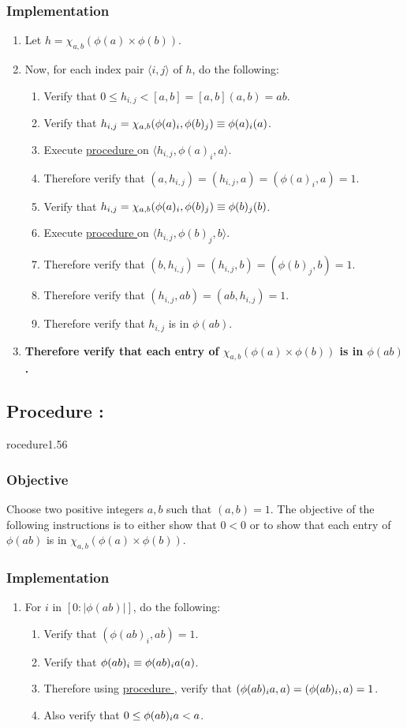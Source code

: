 \documentclass{article}
\let\mod\relax\DeclareMathOperator{\mod}{mod}
\newcounter{procedure}[part]
\newcommand{\procedure}[1]{\subsection*{Procedure \thepart:\theprocedure}\label{sec:procedure #1}\global\expandafter\edef\csname procedure#1\endcsname{\thepart:\theprocedure}\addtocounter{procedure}{1}}
\newcommand{\objective}{\subsubsection*{Objective}}
\newcommand{\implementation}{\subsubsection*{Implementation}}
\newcommand{\procedurehr}[1]{\hyperref[sec:procedure #1]{procedure \expandafter\csname procedure#1\endcsname}}
\begin{document}
\begin{multicols}{2}
			\implementation
				\begin{enumerate}
					\item Let $h=\chi_{a,b}(\phi(a)\times\phi(b))$.
					\item Now, for each index pair $\langle i,j\rangle$ of $h$, do the following:
					\begin{enumerate}
						\item Verify that $0\le h_{i,j}<[a,b]=[a,b](a,b)=ab$.
						\item Verify that $h_{i,j}=\chi_{a,b}(\phi(a)_i,\phi(b)_j)\equiv\phi(a)_i(\mod a)$.
						\item Execute \procedurehr{1.17} on $\langle h_{i,j},\phi(a)_i,a\rangle$.
						\item Therefore verify that $(a,h_{i,j})=(h_{i,j},a)=(\phi(a)_i,a)=1$.
						\item Verify that $h_{i,j}=\chi_{a,b}(\phi(a)_i,\phi(b)_j)\equiv\phi(b)_j(\mod b)$.
						\item Execute \procedurehr{1.17} on $\langle h_{i,j},\phi(b)_j,b\rangle$.
						\item Therefore verify that $(b,h_{i,j})=(h_{i,j},b)=(\phi(b)_j,b)=1$.
						\item Therefore verify that $(h_{i,j},ab)=(ab,h_{i,j})=1$.
						\item Therefore verify that $h_{i,j}$ is in $\phi(ab)$.
					\end{enumerate}
					\item \textbf{Therefore verify that each entry of $\chi_{a,b}(\phi(a)\times\phi(b))$ is in $\phi(ab)$.}
				\end{enumerate}
		\procedure{1.56}
			\objective
				Choose two positive integers $a,b$ such that $(a,b)=1$. The objective of the following instructions is to either show that $0<0$ or to show that each entry of $\phi(ab)$ is in $\chi_{a,b}(\phi(a)\times\phi(b))$.
			\implementation
				\begin{enumerate}
					\item For $i$ in $[0:\lvert\phi(ab)\rvert]$, do the following:
					\begin{enumerate}
						\item Verify that $(\phi(ab)_i,ab)=1$.
						\item Verify that $\phi(ab)_i\equiv\phi(ab)_i\mod a(\mod a)$.
						\item Therefore using \procedurehr{1.17}, verify that $(\phi(ab)_i\mod a,a)=(\phi(ab)_i,a)=1$.
						\item Also verify that $0\le \phi(ab)_i\mod a<a$.

\end{enumerate}
\end{enumerate}
\end{multicols}
\end{document}
